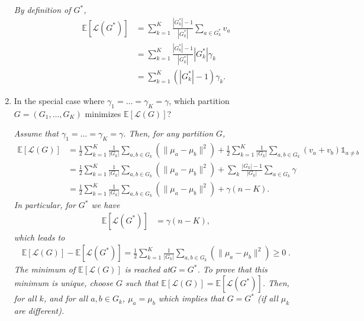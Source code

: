 \documentclass[a4paper,10pt,fleqn]{article}
\newcommand{\E}{\ensuremath{\mathbb{E}}}
\newcommand{\1}{\ensuremath{\mathbbm{1}}}
\newcommand{\crit}{\mathcal{L}}
\begin{document}
\begin{enumerate}
\vspace{.2cm}

{\em
By definition of  $G^*$,  
	\begin{align*}
	\E \left[ \crit(G^*) \right] & =\sum_{k=1}^K \frac{|G^*_k|-1}{|G^*_k|} \sum_{a \in G^*_{k}} v_a\\
	& = \sum_{k=1}^K \frac{|G^*_k|-1}{|G^*_k|} |G^*_k| \gamma_k\\
	& = \sum_{k=1}^K (|G^*_k|-1) \gamma_k.
	\end{align*}
}
\item In the special case where $\gamma_{1}=\ldots=\gamma_{K}=\gamma$, which partition $G=(G_{1},\ldots,G_{K})$ minimizes $\E[\crit(G)]$?

\vspace{.2cm}

{\em
Assume that $\gamma_1 = \hdots = \gamma_K = \gamma$. Then, for any partition $G$, 
	\begin{align*}
	\E \left[ \crit(G) \right] & = \frac{1}{2}  \sum_{k=1}^K \frac{1}{|G_k|}\sum_{a, b\in G_{k}} \left( \| \mu_a - \mu_b\|^2 \right)
	+ \frac{1}{2}  \sum_{k=1}^K \frac{1}{|G_k|}\sum_{a, b\in G_{k}} \left( v_a + v_b \right) \mathds{1}_{a \neq b}\\
	& = \frac{1}{2}  \sum_{k=1}^K \frac{1}{|G_k|}\sum_{a, b\in G_{k}} \left( \| \mu_a - \mu_b\|^2 \right) + \sum_k \frac{|G_k|-1}{|G_k|} \sum_{a \in G_k} \gamma\\
	& = \frac{1}{2}  \sum_{k=1}^K \frac{1}{|G_k|}\sum_{a, b\in G_{k}} \left( \| \mu_a - \mu_b\|^2 \right) + \gamma(n-K).
	\end{align*}
	In particular, for $G^*$ we have
	\begin{align*}
	\E \left[ \crit(G^*) \right] & = \gamma(n-K),
	\end{align*}
	which leads to 
	\begin{align*}
	\E \left[ \crit(G) \right] - \E \left[ \crit(G^*) \right] = \frac{1}{2}  \sum_{k=1}^K \frac{1}{|G_k|}\sum_{a, b\in G_{k}} \left( \| \mu_a - \mu_b\|^2 \right) \geq 0\;.
	\end{align*}
	The minimum of $\E \left[ \crit(G) \right]$ is reached at$G = G^*$. To prove that this minimum is unique, choose $G$ such that $\E \left[ \crit(G) \right] = \E \left[ \crit(G^*) \right]$. Then, for all $k$, and for all $a,b \in G_k$,  $\mu_a = \mu_b$ which implies that $G = G^*$ (if all $\mu_k$ are different).
}
\end{enumerate}
	
	
\end{document}
